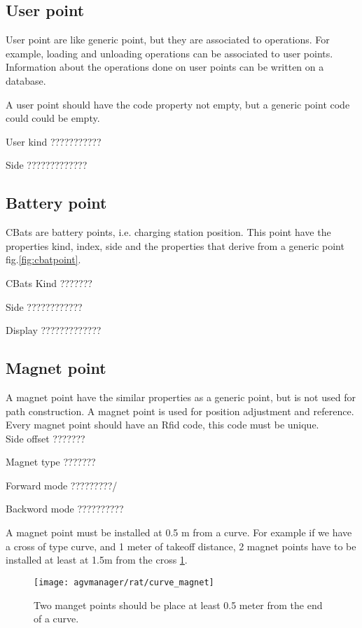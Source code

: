 \subsection{User point}
User point are like generic point, but they are associated to operations. For example, loading and unloading operations can be associated to user points. Information about the operations done on user points can be written on a database.

A user point should have the code property not empty, but a generic point code could could be empty.

User kind ???????????

Side ?????????????

\subsection{Battery point}
CBats are battery points, i.e. charging station position. This point have the properties kind, index, side and the properties that derive from a generic point fig.\ref{fig:cbatpoint}.

CBats Kind ???????

Side ????????????

Display ?????????????


\subsection{Magnet point}
A magnet point have the similar properties as a generic point, but is not used for path construction. A magnet point is used for position adjustment and reference. Every magnet point should have an Rfid code, this code must be unique.\\

Side offset ???????

Magnet type ???????

Forward mode ?????????/

Backword mode ??????????

A magnet point must be installed at 0.5 m from a curve. For example if we have a cross of type curve, and 1 meter of takeoff distance, 2 magnet points have to be installed at least at 1.5m from the cross \ref{fig:curve_magnet}.

\begin{figure}[h]
	\centering\texttt{[image: agvmanager/rat/curve\_magnet]}
	\caption{Two manget points should be place at least 0.5 meter from the end of a curve.}
	\label{fig:curve_magnet}
\end{figure}

